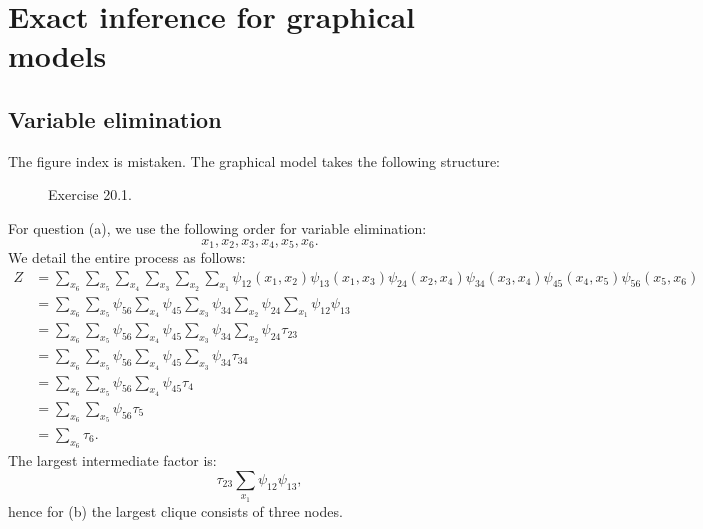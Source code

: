 \documentclass[UTF8]{ctexart}
\begin{document}
\newpage
\section{Exact inference for graphical models}
\subsection{Variable elimination}
The figure index is mistaken.
The graphical model takes the following structure:
\begin{figure}[htbp]
\centering
{}
\caption{Exercise 20.1.}
\end{figure}

For question (a), we use the following order for variable elimination:
$$x_{1},x_{2},x_{3},x_{4},x_{5},x_{6}.$$
We detail the entire process as follows:
$$
\begin{aligned}
Z&=\sum_{x_{6}}\sum_{x_{5}}\sum_{x_{4}}\sum_{x_{3}}\sum_{x_{2}}\sum_{x_{1}}\psi_{12}(x_{1},x_{2})\psi_{13}(x_{1},x_{3})\psi_{24}(x_{2},x_{4})\psi_{34}(x_{3},x_{4})\psi_{45}(x_{4},x_{5})\psi_{56}(x_{5},x_{6})\\
&=\sum_{x_{6}}\sum_{x_{5}}\psi_{56}\sum_{x_{4}}\psi_{45}\sum_{x_{3}}\psi_{34}\sum_{x_{2}}\psi_{24}\sum_{x_{1}}\psi_{12}\psi_{13}\\
&=\sum_{x_{6}}\sum_{x_{5}}\psi_{56}\sum_{x_{4}}\psi_{45}\sum_{x_{3}}\psi_{34}\sum_{x_{2}}\psi_{24}\tau_{23}\\
&=\sum_{x_{6}}\sum_{x_{5}}\psi_{56}\sum_{x_{4}}\psi_{45}\sum_{x_{3}}\psi_{34}\tau_{34}\\
&=\sum_{x_{6}}\sum_{x_{5}}\psi_{56}\sum_{x_{4}}\psi_{45}\tau_{4}\\
&=\sum_{x_{6}}\sum_{x_{5}}\psi_{56}\tau_{5}\\
&=\sum_{x_{6}}\tau_{6}.
\end{aligned}
$$
The largest intermediate factor is:
$$\tau_{23}\sum_{x_{1}}\psi_{12}\psi_{13},$$
hence for (b) the largest clique consists of three nodes.
\end{document}
